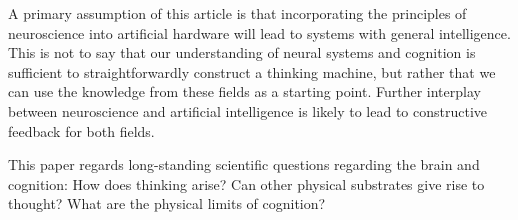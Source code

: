 \vspace{3em}
A primary assumption of this article is that incorporating the principles of neuroscience into artificial hardware will lead to systems with general intelligence. This is not to say that our understanding of neural systems and cognition is sufficient to straightforwardly construct a thinking machine, but rather that we can use the knowledge from these fields as a starting point. Further interplay between neuroscience and artificial intelligence is likely to lead to constructive feedback for both fields.

\vspace{3em}
This paper regards long-standing scientific questions regarding the brain and cognition: How does thinking arise? Can other physical substrates give rise to thought? What are the physical limits of cognition?